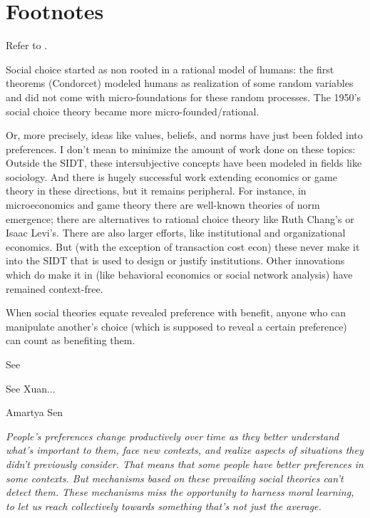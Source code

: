 \section{Footnotes}
\begin{thebibliography}{99}

 Refer to \cite{manin1997}.

 Social choice started as non rooted in a rational model of humans: the first theorems (Condorcet) modeled humans as realization of some random variables and did not come with micro-foundations for these random processes. The 1950's social choice theory became more micro-founded/rational.

 Or, more precisely, ideas like values, beliefs, and norms have just been folded into preferences. I don't mean to minimize the amount of work done on these topics: Outside the SIDT, these intersubjective concepts have been modeled in fields like sociology. And there is hugely successful work extending economics or game theory in these directions, but it remains peripheral. For instance, in microeconomics and game theory there are well-known theories of norm emergence; there are alternatives to rational choice theory like Ruth Chang's or Isaac Levi's. There are also larger efforts, like institutional and organizational economics. But (with the exception of transaction cost econ) these never make it into the SIDT that is used to design or justify institutions. Other innovations which do make it in (like behavioral economics or social network analysis) have remained context-free.

 When social theories equate revealed preference with benefit, anyone who can manipulate another's choice (which is supposed to reveal a certain preference) can count as benefiting them.

 See \cite{klingefjord2024}

 See Xuan...

 Amartya Sen

 \textit{People's preferences change productively over time as they better understand what's important to them, face new contexts, and realize aspects of situations they didn't previously consider. That means that some people have better preferences in some contexts. But mechanisms based on these prevailing social theories can't detect them. These mechanisms miss the opportunity to harness moral learning, to let us reach collectively towards something that's not just the average.}


\end{thebibliography}
